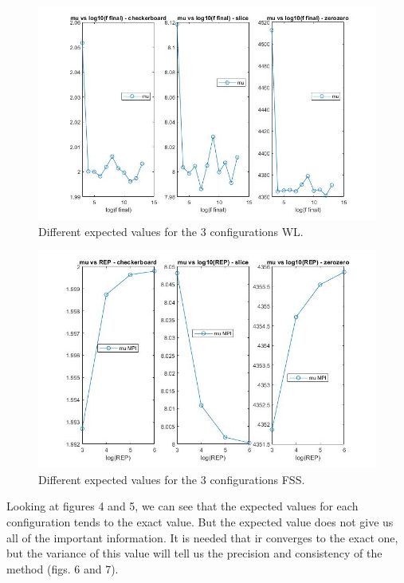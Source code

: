 \documentclass[a4paper, 11pt]{article}
\begin{document}
	\begin{figure}[h]
		\includegraphics[scale=0.3]{mu_WL}
		\centering
		\caption{Different expected values for the 3 configurations WL.}
	\end{figure}
	
	\begin{figure}[h]
		\includegraphics[scale=0.3]{mu_new_rps}
		\centering
		\caption{Different expected values for the 3 configurations FSS.}
	\end{figure}

	
	Looking at figures 4 and 5, we can see that the expected values for each configuration tends to the exact value. But the expected value does not give us all of the important information. It is needed that ir converges to the exact one, but the variance of this value will tell us the precision and consistency of the method (figs. 6 and 7).
	
	\newpage
\end{document}
